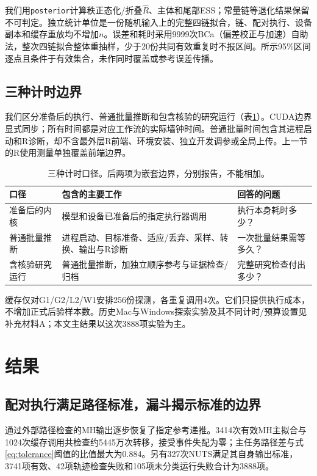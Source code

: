 \documentclass[UTF8,fontset=fandol,zihao=-4]{ctexart}
\begin{document}
我们用\texttt{posterior}计算秩正态化/折叠$\hat R$、主体和尾部ESS\cite{vehtari,posterior}；常量链等退化结果保留不可判定。独立统计单位是一份随机输入上的完整四链拟合，链、配对执行、设备副本和缓存重放均不增加$n$。误差和耗时采用9999次BCa（偏差校正与加速）自助法，整次四链拟合整体重抽样，少于20份共同有效重复时不报区间。所示95\%区间逐点且条件于有效集合，未作同时覆盖或参考误差传播。

\subsection{三种计时边界}
我们区分准备后的执行、普通批量推断和包含核验的研究运行（表\ref{tab:cost-scope}）。CUDA边界显式同步；所有时间都是对应工作流的实际墙钟时间。普通批量时间包含其进程启动和R诊断，却不含最外层R前端、环境安装、独立开发调参或全局上传。上一节的R使用测量单独覆盖前端边界。
\begin{table}[htbp]\centering\small
\begin{tabular}{p{.23\linewidth}p{.44\linewidth}p{.24\linewidth}}\toprule
口径 & 包含的主要工作 & 回答的问题\\\midrule
准备后的内核 & 模型和设备已准备后的指定执行器调用 & 执行本身耗时多少？\\
普通批量推断 & 进程启动、目标准备、适应/丢弃、采样、转换、输出与R诊断 & 一次批量结果需等多久？\\
含核验研究运行 & 普通批量推断，加独立顺序参考与证据检查/归档 & 完整研究检查付出多少？\\\bottomrule
\end{tabular}
\caption{三种计时口径。后两项为嵌套边界，分别报告，不能相加。}\label{tab:cost-scope}
\end{table}

缓存仅对G1/G2/L2/W1安排256份探测，各重复调用4次。它们只提供执行成本，不增加正式后验样本数。历史Mac与Windows探索实验及其不同计时/预算设置见补充材料A；本文主结果以这次3888项实验为主。

\section{结果}
\subsection{配对执行满足路径标准，漏斗揭示标准的边界}
通过外部路径检查的MH输出逐步恢复了指定参考递推。3414次有效MH主拟合与1024次缓存调用共检查约5445万次转移，接受事件失配为零；主任务路径差与式\eqref{eq:tolerance}阈值的比值最大为0.884。另有327次NUTS满足其自身输出标准，3741项有效、42项轨迹检查失败和105项未分类运行失败合计为3888项。
\end{document}
